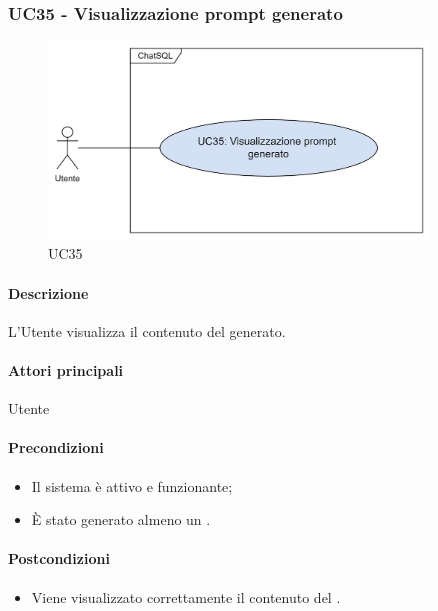 \subsubsection{UC35 - Visualizzazione prompt generato}\label{UC35}

\begin{figure}[H]
  \centering
  \includegraphics[width=0.90\textwidth]{assets/uc35.png}
  \caption{UC35}
\end{figure}

\paragraph*{Descrizione}
L'Utente visualizza il contenuto del  generato.

\paragraph*{Attori principali}
Utente

\paragraph*{Precondizioni}
\begin{itemize}
  \item Il sistema è attivo e funzionante;
  \item È stato generato almeno un .
\end{itemize}

\paragraph*{Postcondizioni}
\begin{itemize}
  \item Viene visualizzato correttamente il contenuto del .
\end{itemize}

